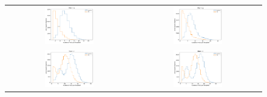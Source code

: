 \documentclass[preprintm,linenumbers]{aastex631}
\begin{document}
    \begin{figure}
			\centering
			\begin{tabular}{c c}
				\includegraphics[width=0.4\textwidth]{results/histograms/hist_first_year_one_snap_v4_0_10yrs_db_noDD_noTwi_CountMetric_doAllTemplateMetrics_reduceCount_u_7_noDD_noTwi.pdf} &
				 \includegraphics[width=0.4\textwidth]{results/histograms/hist_first_year_one_snap_v4_0_10yrs_db_noDD_noTwi_CountMetric_doAllTemplateMetrics_reduceCount_g_7_noDD_noTwi.pdf} \\
				 \includegraphics[width=0.4\textwidth]{results/histograms/hist_first_year_one_snap_v4_0_10yrs_db_noDD_noTwi_CountMetric_doAllTemplateMetrics_reduceCount_r_7_noDD_noTwi.pdf} &
				\includegraphics[width=0.4\textwidth]{results/histograms/hist_first_year_one_snap_v4_0_10yrs_db_noDD_noTwi_CountMetric_doAllTemplateMetrics_reduceCount_i_7_noDD_noTwi.pdf} \\

\end{tabular}
\end{figure}
\end{document}
